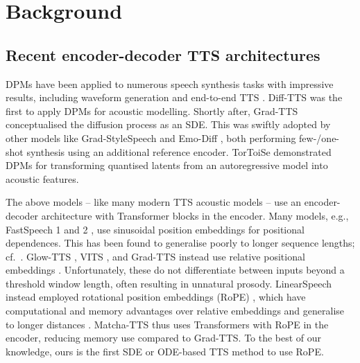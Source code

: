\documentclass[british]{article}
\begin{document}
\section{Background}
\label{sec:background}
\subsection{Recent encoder-decoder TTS architectures}


DPMs have been applied to numerous speech synthesis tasks with impressive results, including waveform generation \cite{chen2021wavegrad,kongdiffwave} and end-to-end TTS \cite{chen2021wavegrad2}.
Diff-TTS \cite{jeong2021diff} was the first to apply DPMs for acoustic modelling.
Shortly after, Grad-TTS \cite{popov2021grad} conceptualised the diffusion process as an SDE.
This was swiftly adopted by other models like Grad-StyleSpeech \cite{kang2023gradstylespeech} and Emo-Diff \cite{guo2023emodiff}, both performing few-/one-shot synthesis using an additional reference encoder.
TorToiSe \cite{betker2023better} demonstrated DPMs for transforming quantised latents from an autoregressive model into acoustic features.


The above models -- like many modern TTS acoustic models -- use an encoder-decoder architecture with Transformer blocks
in the encoder.
Many models, e.g., FastSpeech 1 and 2 \cite{ren2019fastspeech,ren2021fastspeech2},
use sinusoidal position embeddings for positional dependences.
This has been found to generalise poorly to longer sequence lengths; cf.\ \cite{press2022train}.
Glow-TTS \cite{kim2020glow}, VITS \cite{kim2021vits}, and Grad-TTS instead use relative positional embeddings \cite{shaw2018self}.
Unfortunately, these do not differentiate between inputs beyond a threshold window length, often resulting in unnatural prosody.
LinearSpeech \cite{zhang2021linearspeech} instead employed rotational position embeddings (RoPE) \cite{su2021roformer}, which have computational and memory advantages over relative embeddings and generalise to longer distances \cite{wennberg2021case,press2022train}.
Matcha-TTS thus uses Transformers with RoPE
in the encoder, reducing memory use compared to Grad-TTS.
To the best of our knowledge, ours is the first SDE or ODE-based TTS method to use RoPE.
\end{document}
